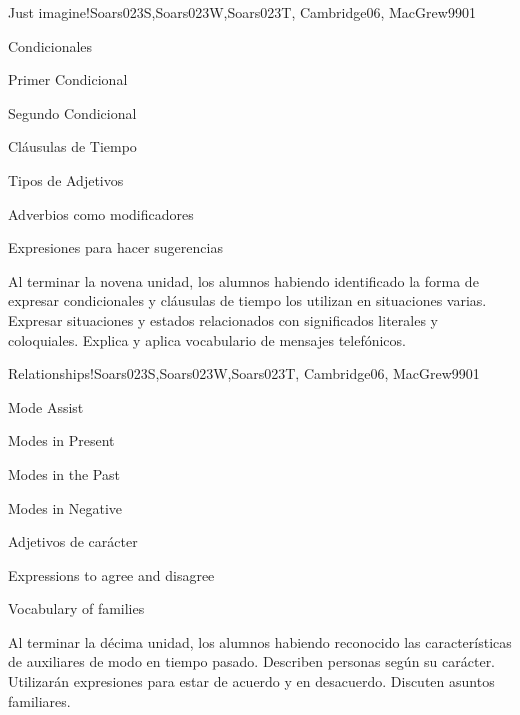\begin{syllabus}
\begin{unit}{Just imagine!}{Soars023S,Soars023W,Soars023T, Cambridge06, MacGrew99}{0}{1}
   \begin{topics}
      \item Condicionales
      \item Primer Condicional
      \item Segundo Condicional
      \item Cláusulas de Tiempo
      \item Tipos de Adjetivos
      \item Adverbios como modificadores
      \item Expresiones para hacer sugerencias
   \end{topics}

   \begin{unitgoals}
      \item Al terminar la novena unidad, los alumnos habiendo identificado la forma de expresar condicionales y cláusulas de tiempo los utilizan en situaciones varias. Expresar situaciones y estados relacionados con significados literales y coloquiales. Explica y aplica vocabulario de mensajes telefónicos.
   \end{unitgoals}

\end{unit}

\begin{unit}{Relationships!}{Soars023S,Soars023W,Soars023T, Cambridge06, MacGrew99}{0}{1}
   \begin{topics}
      \item Mode Assist
      \item Modes in Present
      \item Modes in the Past
      \item Modes in Negative
      \item Adjetivos de carácter
      \item Expressions to agree and disagree
      \item Vocabulary of families
   \end{topics}

   \begin{unitgoals}
      \item Al terminar la décima unidad, los alumnos habiendo reconocido las características de auxiliares de modo en tiempo pasado. Describen personas según su carácter. Utilizarán expresiones para estar de acuerdo y en desacuerdo. Discuten asuntos familiares. 
   \end{unitgoals}


\end{unit}
\end{syllabus}

